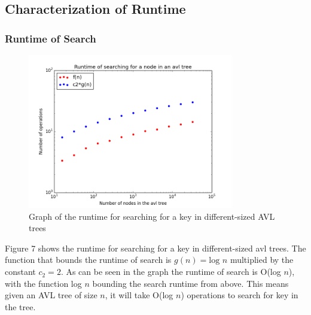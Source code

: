 \documentclass[12pt]{article}
\begin{document}
\subsection*{Characterization of Runtime}

\subsubsection*{Runtime of Search}
\begin{figure}[h]
\caption{Graph of the runtime for searching for a key in different-sized AVL
trees}
\includegraphics[width=9cm]{search_runtime.png}
\centering
\end{figure}
\noindent
Figure 7 shows the runtime for searching for a key in different-sized
avl trees.
The function that bounds the runtime of search is $g(n)= \text{log }n$ multiplied by
the constant $c_2=2$.
As can be seen in the graph the
runtime of search is O(log $n$), with the function log $n$ bounding the
search runtime from above.  This means given an AVL tree of size $n$, it will
take  O(log $n$) operations to search for key in the tree.

\end{document}
